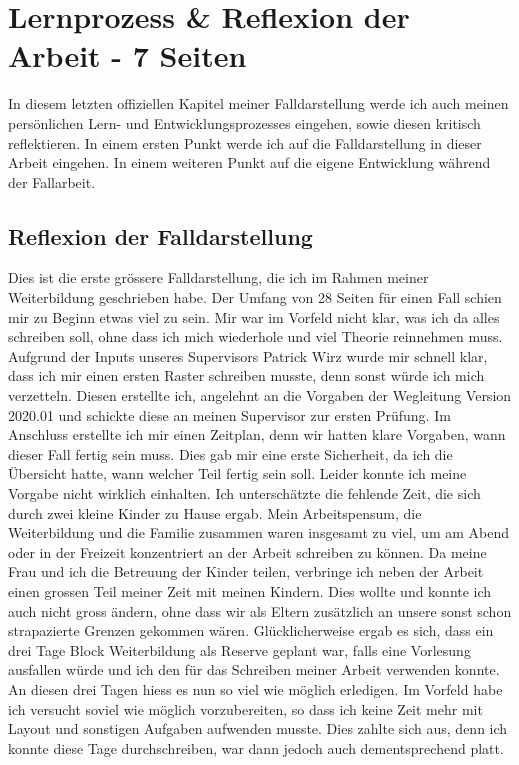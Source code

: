 \section{Lernprozess \& Reflexion der Arbeit - 7 Seiten}\label{Reflexion}
In diesem letzten offiziellen Kapitel meiner Falldarstellung werde ich auch meinen persönlichen Lern- und Entwicklungsprozesses eingehen, sowie diesen kritisch reflektieren. In einem ersten Punkt werde ich auf die Falldarstellung in dieser Arbeit eingehen. In einem weiteren Punkt auf die eigene Entwicklung während der Fallarbeit.

\subsection{Reflexion der Falldarstellung} \label{sec:reflexionfalldarstellung}
Dies ist die erste grössere Falldarstellung, die ich im Rahmen meiner Weiterbildung geschrieben habe. Der Umfang von 28 Seiten für einen Fall schien mir zu Beginn etwas viel zu sein. Mir war im Vorfeld nicht klar, was ich da alles schreiben soll, ohne dass ich mich wiederhole und viel Theorie reinnehmen muss. Aufgrund der Inputs unseres Supervisors Patrick Wirz wurde mir schnell klar, dass ich mir einen ersten Raster schreiben musste, denn sonst würde ich mich verzetteln. Diesen erstellte ich, angelehnt an die Vorgaben der Wegleitung Version 2020.01 und schickte diese an meinen Supervisor zur ersten Prüfung. Im Anschluss erstellte ich mir einen Zeitplan, denn wir hatten klare Vorgaben, wann dieser Fall fertig sein muss. Dies gab mir eine erste Sicherheit, da ich die Übersicht hatte, wann welcher Teil fertig sein soll. Leider konnte ich meine Vorgabe nicht wirklich einhalten. Ich unterschätzte die fehlende Zeit, die sich durch zwei kleine Kinder zu Hause ergab. Mein Arbeitspensum, die Weiterbildung und die Familie zusammen waren insgesamt zu viel, um am Abend oder in der Freizeit konzentriert an der Arbeit schreiben zu können. Da meine Frau und ich die Betreuung der Kinder teilen, verbringe ich neben der Arbeit einen grossen Teil meiner Zeit mit meinen Kindern. Dies wollte und konnte ich auch nicht gross ändern, ohne dass wir als Eltern zusätzlich an unsere sonst schon strapazierte Grenzen gekommen wären. Glücklicherweise ergab es sich, dass ein drei Tage Block Weiterbildung als Reserve geplant war, falls eine Vorlesung ausfallen würde und ich den für das Schreiben meiner Arbeit verwenden konnte. An diesen drei Tagen hiess es nun so viel wie möglich erledigen. Im Vorfeld habe ich versucht soviel wie möglich vorzubereiten, so dass ich keine Zeit mehr mit Layout und sonstigen Aufgaben aufwenden musste. Dies zahlte sich aus, denn ich konnte diese Tage durchschreiben, war dann jedoch auch dementsprechend platt. 


